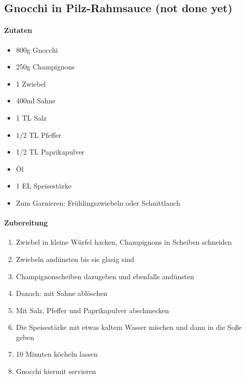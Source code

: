 \newpage
\subsection{Gnocchi in Pilz-Rahmsauce (not done yet)}
\paragraph{Zutaten}
\begin{itemize}[noitemsep]
	\item 800g Gnocchi
	\item 250g Champignons
	\item 1 Zwiebel
	\item 400ml Sahne
	\item 1 TL Salz
	\item 1/2 TL Pfeffer
	\item 1/2 TL Paprikapulver
	\item Öl
	\item 1 EL Speisestärke
	\item Zum Garnieren: Frühlingszwiebeln oder Schnittlauch
\end{itemize}
\paragraph{Zubereitung}
\begin{enumerate}[noitemsep]
	\item Zwiebel in kleine Würfel hacken, Champignons in Scheiben schneiden
	\item Zwiebeln andünsten bis sie glasig sind
	\item Champignonscheiben dazugeben und ebenfalls andünsten
	\item Danach: mit Sahne ablöschen
	\item Mit Salz, Pfeffer und Paprikapulver abschmecken
	\item Die Speisestärke mit etwas kaltem Wasser mischen und dann in die Soße geben
	\item 10 Minuten köcheln lassen
	\item Gnocchi hiermit servieren
\end{enumerate}
